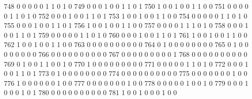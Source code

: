 \documentclass[compress,8pt]{beamer}
\begin{document}
\begin{frame}
\begin{Schunk}
  748      0       0   0              0        0    1       1       0   1   0
  749      0       0   0              1        0    0       1       1   0   1
  750      1       0   0              1        0    0       1       1   0   0
  751      0       0   0              0        0    1       1       0   1   0
  752      0       0   0              1        0    0       1       1   0   1
  753      1       0   0              1        0    0       1       1   0   0
  754      0       0   0              0        0    1       1       0   1   0
  755      0       0   0              1        0    0       1       1   0   1
  756      1       0   0              1        0    0       1       1   0   0
  757      0       0   0              0        1    1       1       0   1   0
  758      0       0   0              1        0    0       1       1   0   1
  759      0       0   0              0        0    1       1       0   1   0
  760      0       0   0              1        0    0       1       1   0   1
  761      1       0   0              1        0    0       1       1   0   0
  762      1       0   0              1        0    0       1       1   0   0
  763      0       0   0              0        0    0       0       0   0   0
  764      0       1   0              0        0    0       0       0   0   0
  765      0       1   0              0        0    0       0       0   0   0
  766      0       0   0              0        0    0       0       0   0   0
  767      0       0   0              0        0    0       0       0   0   1
  768      0       0   0              0        0    0       0       0   0   0
  769      0       1   0              0        1    1       0       0   1   0
  770      1       0   0              0        0    0       0       0   0   0
  771      0       0   0              0        0    1       1       0   1   0
  772      0       0   0              1        0    0       1       1   0   1
  773      0       1   0              0        0    0       0       0   0   0
  774      0       0   0              0        0    0       0       0   0   0
  775      0       0   0              0        0    0       0       1   0   0
  776      1       0   0              0        0    0       0       1   0   0
  777      0       0   0              0        0    0       0       1   0   0
  778      0       0   0              0        0    1       0       0   1   0
  779      0       0   0              1        0    0       0       1   0   1
  780      0       0   0              0        0    0       0       0   0   0
  781      1       0   0              1        0    0       0       1   0   0

\end{Schunk}
\end{frame}
\end{document}
